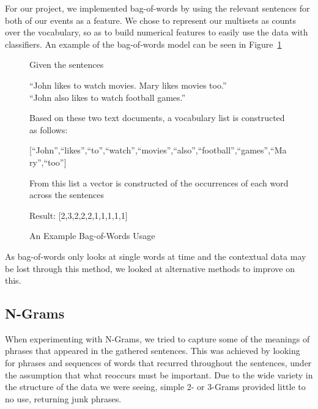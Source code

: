 \documentclass[bsc,frontabs,twoside,singlespacing,parskip,deptreport]{infthesis}     %
\begin{document}
For our project, we implemented bag-of-words by using the relevant sentences for both of our events as a feature.
We chose to represent our multisets as counts over the vocabulary, so as to build numerical features to easily
use the data with classifiers. An example of the bag-of-words model can be seen in Figure~\ref{fig:bow}
\begin{figure}[H]
\begin{tcolorbox}[width=\textwidth,
                  interior hidden,
                  boxsep=10pt,
                  left=0pt,
                  right=0pt,
                  top=2pt,
                  ]%
  Given the sentences \vspace{0.5em}\\
  \begin{center}``John likes to watch movies. Mary likes movies too.''\\
  ``John also likes to watch football games.''\vspace{1em}\\
   \end{center}
    Based on these two text documents, a vocabulary list is constructed as follows:\vspace{1em}\\
    \begin{center}
  [``John'',``likes'',``to'',``watch'',``movies'',``also'',``football'',``games'',``Mary'',``too'']\vspace{1em}\\
\end{center}
    From this list a vector is constructed of the occurrences
    of each word across the sentences\vspace{1em}\\
 \begin{center} 
  Result: [2,3,2,2,2,1,1,1,1,1]
\end{center}
\end{tcolorbox}
\caption{An Example Bag-of-Words Usage}
\label{fig:bow}
\end{figure}

As bag-of-words only looks at single words at time and the contextual data may be lost through this method, we looked at
alternative methods to improve on this.

\subsection{N-Grams}
When experimenting with N-Grams, we tried to capture some of the meanings of phrases that appeared in the gathered
sentences.
This was achieved by looking for phrases and sequences of words that recurred throughout the sentences, under the assumption
that what reoccurs must be important. Due to the wide variety in the structure of the data we were seeing,
simple 2- or 3-Grams provided little to no use, returning junk phrases.
\end{document}
